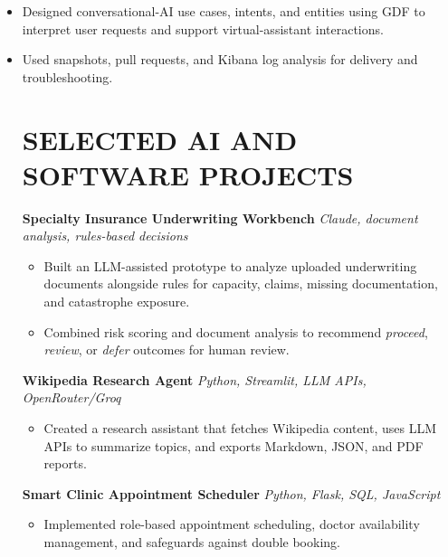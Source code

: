 \documentclass[10pt,a4paper]{article}
\begin{document}
\begin{itemize}
  \item Designed conversational-AI use cases, intents, and entities using GDF to interpret user requests and support virtual-assistant interactions.
  \item Used snapshots, pull requests, and Kibana log analysis for delivery and troubleshooting.


\section*{SELECTED AI AND SOFTWARE PROJECTS}
\textbf{Specialty Insurance Underwriting Workbench} \textbar{} \textit{Claude, document analysis, rules-based decisions}
\begin{itemize}
  \item Built an LLM-assisted prototype to analyze uploaded underwriting documents alongside rules for capacity, claims, missing documentation, and catastrophe exposure.
  \item Combined risk scoring and document analysis to recommend \textit{proceed}, \textit{review}, or \textit{defer} outcomes for human review.
\end{itemize}

\textbf{Wikipedia Research Agent} \textbar{} \textit{Python, Streamlit, LLM APIs, OpenRouter/Groq}
\begin{itemize}
  \item Created a research assistant that fetches Wikipedia content, uses LLM APIs to summarize topics, and exports Markdown, JSON, and PDF reports.
\end{itemize}

\textbf{Smart Clinic Appointment Scheduler} \textbar{} \textit{Python, Flask, SQL, JavaScript}
\begin{itemize}
  \item Implemented role-based appointment scheduling, doctor availability management, and safeguards against double booking.
\end{itemize}


\end{itemize}
\end{document}

